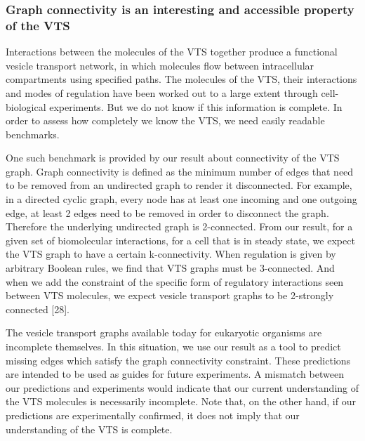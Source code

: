 \subsubsection{Graph connectivity is an interesting and accessible property of the VTS}
Interactions between the molecules of the VTS together produce a functional vesicle transport network, in which molecules flow between intracellular compartments using specified paths. The molecules of the VTS, their interactions and modes of regulation have been worked out to a large extent through cell-biological experiments. But we do not know if this information is complete. In order to assess how completely we know the VTS, we need easily readable benchmarks. 

One such benchmark is provided by our result about connectivity of the VTS graph. Graph connectivity is defined as the minimum number of edges that need to be removed from an undirected graph to render it disconnected. For example, in a directed cyclic graph, every node has at least one incoming and one outgoing edge, at least 2 edges need to be removed in order to disconnect the graph. Therefore the underlying undirected graph is 2-connected. 
From our result, for a given set of biomolecular interactions, for a cell that is in steady state, we expect the VTS graph to have a certain k-connectivity. When regulation is given by arbitrary Boolean rules,   we find that VTS graphs must be 3-connected. And when we add the constraint of the specific form of regulatory interactions seen between VTS molecules, we expect vesicle transport graphs to be 2-strongly connected [28].

The vesicle transport graphs available today for eukaryotic organisms are incomplete themselves. 
%
In this situation, we use our result as a tool to predict missing edges which satisfy the graph connectivity constraint. 
%
These predictions are intended to be used as guides for future experiments. 
%
A mismatch between our predictions and experiments would indicate that our current understanding of the VTS molecules is necessarily incomplete. 
%
Note that, on the other hand, if our predictions are experimentally confirmed, it does not imply that our understanding of the VTS is complete.\\

